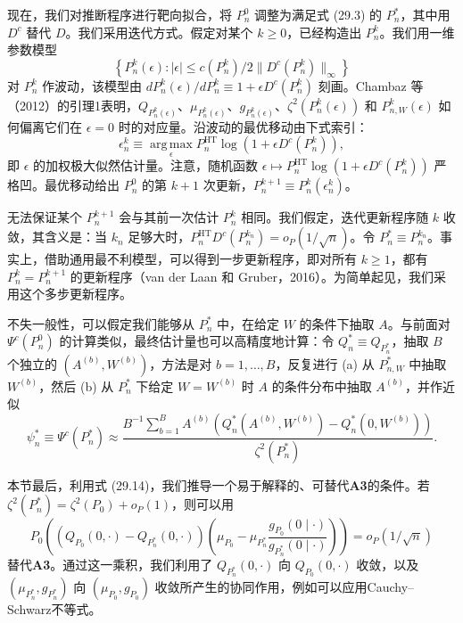 现在，我们对推断程序进行靶向拟合，将 $P_n^0$ 调整为满足式 (29.3) 的 $P_n^*$，其中用 $D^c$ 替代 $D$。我们采用迭代方式。假定对某个 $k\ge0$，已经构造出 $P_n^k$。我们用一维参数模型
\[
\left\{P_n^k(\epsilon):|\epsilon|\le c(P_n^k)/2\|D^c(P_n^k)\|_\infty\right\}
\]
对 $P_n^k$ 作波动，该模型由 $dP_n^k(\epsilon)/dP_n^k\equiv1+\epsilon D^c(P_n^k)$ 刻画。Chambaz 等（2012）的引理1表明，$Q_{P_n^k(\epsilon)}$、$\mu_{P_n^k(\epsilon)}$、$g_{P_n^k(\epsilon)}$、$\zeta^2(P_n^k(\epsilon))$ 和 $P_{n,W}^k(\epsilon)$ 如何偏离它们在 $\epsilon=0$ 时的对应量。沿波动的最优移动由下式索引：
\[
\epsilon_n^k\equiv\operatorname*{arg\,max}_{\epsilon}
P_n^{\mathrm{HT}}\log\left(1+\epsilon D^c(P_n^k)\right),
\]
即 $\epsilon$ 的加权极大似然估计量。注意，随机函数 $\epsilon\mapsto P_n^{\mathrm{HT}}\log(1+\epsilon D^c(P_n^k))$ 严格凹。最优移动给出 $P_n^0$ 的第 $k+1$ 次更新，$P_n^{k+1}\equiv P_n^k(\epsilon_n^k)$。

无法保证某个 $P_n^{k+1}$ 会与其前一次估计 $P_n^k$ 相同。我们假定，迭代更新程序随 $k$ 收敛，其含义是：当 $k_n$ 足够大时，$P_n^{\mathrm{HT}}D^c(P_n^{k_n})=o_P(1/\sqrt n)$。令 $P_n^*\equiv P_n^{k_n}$。事实上，借助通用最不利模型，可以得到一步更新程序，即对所有 $k\ge1$，都有 $P_n^k=P_n^{k+1}$ 的更新程序（van der Laan 和 Gruber，2016）。为简单起见，我们采用这个多步更新程序。

不失一般性，可以假定我们能够从 $P_n^*$ 中，在给定 $W$ 的条件下抽取 $A$。与前面对 $\Psi^c(P_n^0)$ 的计算类似，最终估计量也可以高精度地计算：令 $Q_n^*\equiv Q_{P_n^*}$，抽取 $B$ 个独立的 $(A^{(b)},W^{(b)})$，方法是对 $b=1,\ldots,B$，反复进行 (a) 从 $P_{n,W}^*$ 中抽取 $W^{(b)}$，然后 (b) 从 $P_n^*$ 下给定 $W=W^{(b)}$ 时 $A$ 的条件分布中抽取 $A^{(b)}$，并作近似
\[
\psi_n^*\equiv\Psi^c(P_n^*)\approx
\frac{B^{-1}\sum_{b=1}^BA^{(b)}\left(Q_n^*(A^{(b)},W^{(b)})-Q_n^*(0,W^{(b)})\right)}{\zeta^2(P_n^*)}.
\]

本节最后，利用式 (29.14)，我们推导一个易于解释的、可替代\textbf{A3}的条件。若 $\zeta^2(P_n^*)=\zeta^2(P_0)+o_P(1)$，则可以用
\[
P_0\!\left(
\left(Q_{P_0}(0,\cdot)-Q_{P_n^*}(0,\cdot)\right)
\left(\mu_{P_0}-\mu_{P_n^*}\frac{g_{P_0}(0\mid\cdot)}{g_{P_n^*}(0\mid\cdot)}\right)
\right)=o_P(1/\sqrt n)
\]
替代\textbf{A3}。通过这一乘积，我们利用了 $Q_{P_n^*}(0,\cdot)$ 向 $Q_{P_0}(0,\cdot)$ 收敛，以及 $(\mu_{P_n^*},g_{P_n^*})$ 向 $(\mu_{P_0},g_{P_0})$ 收敛所产生的协同作用，例如可以应用Cauchy--Schwarz不等式。
